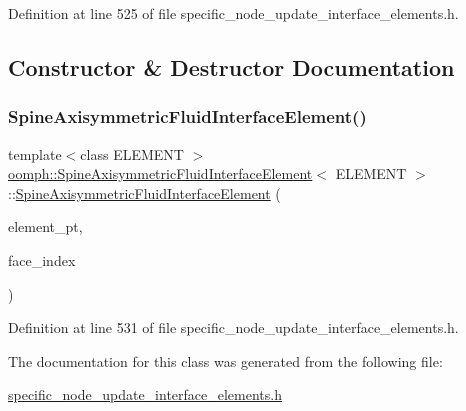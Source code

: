Definition at line 525 of file specific\+\_\+node\+\_\+update\+\_\+interface\+\_\+elements.\+h.



\subsection{Constructor \& Destructor Documentation}
\mbox{\label{classoomph_1_1SpineAxisymmetricFluidInterfaceElement_a66aaa2581711338cf66660d97663d7cb}} 
\subsubsection{\texorpdfstring{Spine\+Axisymmetric\+Fluid\+Interface\+Element()}{SpineAxisymmetricFluidInterfaceElement()}}
{\footnotesize\ttfamily template$<$class E\+L\+E\+M\+E\+NT $>$ \\
\hyperlink{classoomph_1_1SpineAxisymmetricFluidInterfaceElement}{oomph\+::\+Spine\+Axisymmetric\+Fluid\+Interface\+Element}$<$ E\+L\+E\+M\+E\+NT $>$\+::\hyperlink{classoomph_1_1SpineAxisymmetricFluidInterfaceElement}{Spine\+Axisymmetric\+Fluid\+Interface\+Element} (\begin{DoxyParamCaption}\item[{\hyperlink{classoomph_1_1FiniteElement}{Finite\+Element} $\ast$const \&}]{element\+\_\+pt,  }\item[{const int \&}]{face\+\_\+index }\end{DoxyParamCaption})\hspace{0.3cm}{\ttfamily [inline]}}



Definition at line 531 of file specific\+\_\+node\+\_\+update\+\_\+interface\+\_\+elements.\+h.



The documentation for this class was generated from the following file\+:\begin{DoxyCompactItemize}
\item 
\hyperlink{specific__node__update__interface__elements_8h}{specific\+\_\+node\+\_\+update\+\_\+interface\+\_\+elements.\+h}\end{DoxyCompactItemize}
